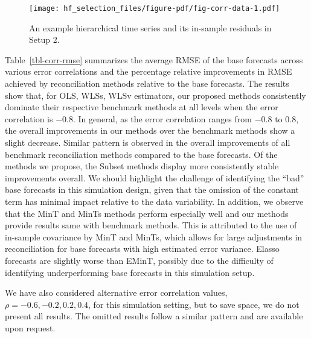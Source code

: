 \documentclass[11pt,a4paper,]{article}
\begin{document}
\begin{figure}

{\centering \texttt{[image: hf\_selection\_files/figure-pdf/fig-corr-data-1.pdf]}

}

\caption{\label{fig-corr-data}An example hierarchical time series and
its in-sample residuals in Setup 2.}

\end{figure}

Table~\ref{tbl-corr-rmse} summarizes the average RMSE of the base
forecasts across various error correlations and the percentage relative
improvements in RMSE achieved by reconciliation methods relative to the
base forecasts. The results show that, for OLS, WLSs, WLSv estimators,
our proposed methods consistently dominate their respective benchmark
methods at all levels when the error correlation is \(-0.8\). In
general, as the error correlation ranges from \(-0.8\) to \(0.8\), the
overall improvements in our methods over the benchmark methods show a
slight decrease. Similar pattern is observed in the overall improvements
of all benchmark reconciliation methods compared to the base forecasts.
Of the methods we propose, the Subset methods display more consistently
stable improvements overall. We should highlight the challenge of
identifying the ``bad'' base forecasts in this simulation design, given
that the omission of the constant term has minimal impact relative to
the data variability. In addition, we observe that the MinT and MinTs
methods perform especially well and our methods provide results same
with benchmark methods. This is attributed to the use of in-sample
covariance by MinT and MinTs, which allows for large adjustments in
reconciliation for base forecasts with high estimated error variance.
Elasso forecasts are slightly worse than EMinT, possibly due to the
difficulty of identifying underperforming base forecasts in this
simulation setup.

We have also considered alternative error correlation values,
\(\rho = -0.6, -0.2, 0.2, 0.4\), for this simulation setting, but to
save space, we do not present all results. The omitted results follow a
similar pattern and are available upon request.
\end{document}
